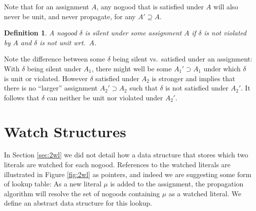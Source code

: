 \documentclass{vutinfth} %
\newtheorem{definition}{Definition}[chapter]
\newcommand{\ass}{A}
\newcommand{\sgl}{\mu}
\begin{document}
Note that for an assignment $\ass$, any nogood that is satisfied under $\ass$ will also never be unit, and never propagate, for any $\ass' \supseteq \ass$.

\begin{definition}
A nogood $\delta$ is \emph{silent} under some assignment $\ass$ if $\delta$ is not violated by $\ass$ and $\delta$ is not unit wrt.~$\ass$.
\end{definition}

Note the difference between some $\delta$ being silent vs.~satisfied under an assignment: With $\delta$ being silent under $\ass_1$, there might well be some $\ass_1' \supset \ass_1$ under which $\delta$ is unit or violated. However $\delta$ satisfied under $\ass_2$ is stronger and implies that there is no \enquote{larger} assignment $\ass_2' \supset \ass_2$ such that $\delta$ is not satisfied under $\ass_2'$. It follows that $\delta$ can neither be unit nor violated under $\ass_2'$.

\section{Watch Structures}

In Section \ref{sec:2wl} we did not detail how a data structure that stores which two literals are watched for each nogood. References to the watched literals are illustrated in Figure \ref{fig:2wl} as pointers, and indeed we are suggesting some form of lookup table: As a new literal $\sgl$ is added to the assignment, the propagation algorithm will resolve the set of nogoods containing $\sgl$ as a watched literal. We define an abstract data structure for this lookup.





\end{document}
